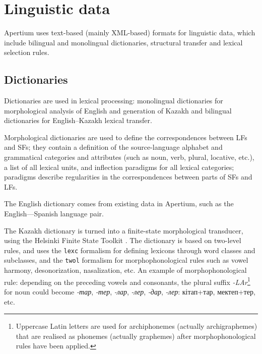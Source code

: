 \documentclass[11pt]{article}
\begin{document}
\section{Linguistic data}

Apertium uses text-based (mainly XML-based) formats for linguistic
data, which include bilingual and monolingual dictionaries, structural
transfer and lexical selection rules.

\subsection{Dictionaries}

Dictionaries are used in lexical processing: monolingual dictionaries
for morphological analysis of English and generation of Kazakh and
bilingual dictionaries for English--Kazakh lexical transfer.  

Morphological dictionaries are used to define the correspondences between LFs and SFs; they contain a definition of the source-language alphabet and grammatical categories and attributes (such as noun, verb, plural, locative, etc.), a list of all lexical units, and inflection paradigms for all lexical categories; paradigms describe regularities in the correspondences
between parts of SFs and LFs.  

The English dictionary comes from existing data in Apertium, such as the English---Spanish language pair.

The Kazakh dictionary \citep{washingtonsalimzyantyers14} is turned
into a finite-state morphological transducer, using the Helsinki
Finite State Toolkit \citep{hfst/2011}. The dictionary is based on
two-level rules, and uses the \texttt{lexc} formalism for defining
lexicons through word classes and subclasses, and the \texttt{twol}
formalism for morphophonological rules such as vowel harmony,
desonorization, nasalization, etc. An example of morphophonological
rule: depending on the preceding vowels and consonants, the plural
suffix \emph{-LAr}\footnote{Uppercase Latin letters are used for
  archiphonemes (actually archigraphemes) that are realised as
  phonemes (actually graphemes) after morphophonological rules have
  been applied.} for noun could become \emph{-тар}, \emph{-тер}, \emph{-лар},
\emph{-лер}, \emph{-дар}, \emph{-лер}:
кітап+тар, мектеп+тер, etc.


\end{document}
